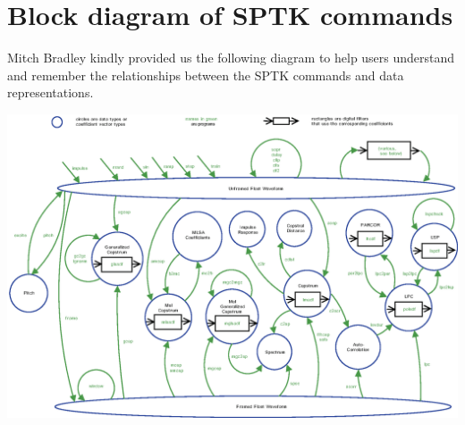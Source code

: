 \chapter*{Block diagram of SPTK commands}%

Mitch Bradley kindly provided us the following diagram to help users understand
and remember the relationships between the SPTK commands and data representations.

\vspace{1.0cm} 

\includegraphics[width=\hsize]{fig/sptk_sigproc.eps} 
